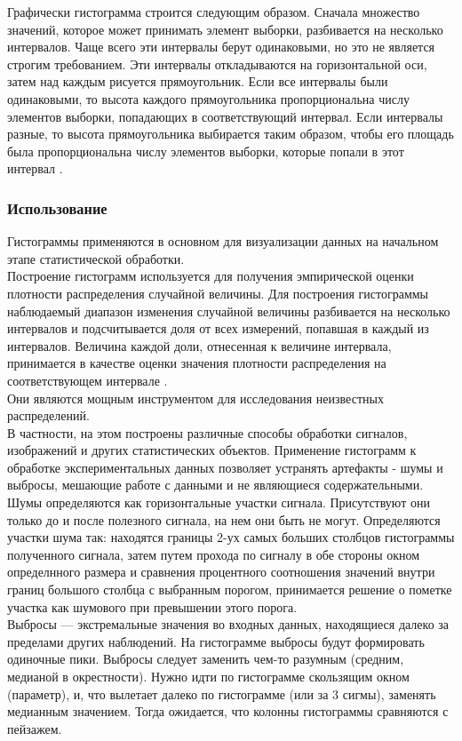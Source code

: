 \documentclass[a4paper,14pt]{article}
\begin{document}
	Графически гистограмма строится следующим образом. Сначала множество значений, которое может принимать элемент выборки, разбивается на несколько интервалов. Чаще всего эти интервалы берут одинаковыми, но это не является строгим требованием. Эти интервалы откладываются на горизонтальной оси, затем над каждым рисуется прямоугольник. Если все интервалы были одинаковыми, то высота каждого прямоугольника пропорциональна числу элементов выборки, попадающих в соответствующий интервал. Если интервалы разные, то высота прямоугольника выбирается таким образом, чтобы его площадь была пропорциональна числу элементов выборки, которые попали в этот интервал \cite{s:hist}.
	
	\subsubsection{Использование}
	
	Гистограммы применяются в основном для визуализации данных на начальном этапе статистической обработки.\\
	Построение гистограмм используется для получения эмпирической оценки плотности распределения случайной величины. Для построения гистограммы наблюдаемый диапазон изменения случайной величины разбивается на несколько интервалов и подсчитывается доля от всех измерений, попавшая в каждый из интервалов. Величина каждой доли, отнесенная к величине интервала, принимается в качестве оценки значения плотности распределения на соответствующем интервале \cite{s:hist}.\\
	Они являются мощным инструментом для исследования неизвестных распределений.\\
	В частности, на этом построены различные способы обработки сигналов, изображений и других статистических объектов. Применение гистограмм к обработке экспериментальных данных позволяет устранять артефакты - шумы и выбросы, мешающие работе с данными и не являющиеся содержательными. \\
	Шумы определяются как горизонтальные участки сигнала. Присутствуют они только до и
	после полезного сигнала, на нем они быть не могут. Определяются участки шума так: находятся границы 2-ух самых больших столбцов гистограммы полученного сигнала, затем путем прохода по сигналу в обе стороны окном определнного размера и сравнения процентного соотношения значений внутри границ большого столбца с выбранным порогом, принимается решение о пометке участка как шумового при превышении этого порога.\\
	Выбросы —  экстремальные значения во входных данных, находящиеся далеко за пределами других наблюдений. На гистограмме выбросы будут формировать одиночные пики. Выбросы следует заменить чем-то разумным (средним, медианой в окрестности). Нужно идти по гистограмме скользящим окном (параметр), и, что вылетает далеко по гистограмме (или за 3 сигмы), заменять медианным значением. Тогда ожидается, что колонны гистограммы сравняются с пейзажем.
	
\end{document}

